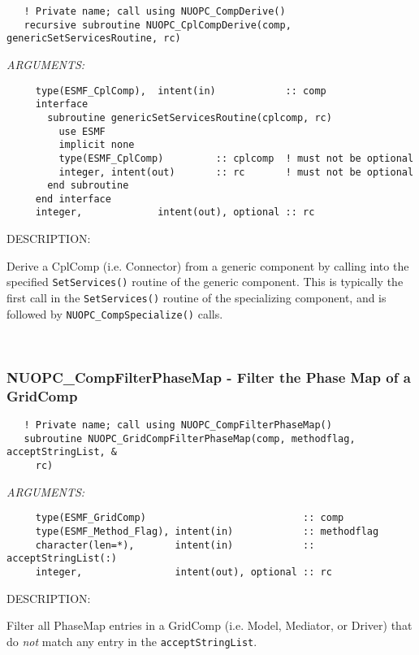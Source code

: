 \begin{verbatim}   ! Private name; call using NUOPC_CompDerive() 
   recursive subroutine NUOPC_CplCompDerive(comp, genericSetServicesRoutine, rc)\end{verbatim}{\em ARGUMENTS:}
\begin{verbatim}     type(ESMF_CplComp),  intent(in)            :: comp
     interface
       subroutine genericSetServicesRoutine(cplcomp, rc)
         use ESMF
         implicit none
         type(ESMF_CplComp)         :: cplcomp  ! must not be optional
         integer, intent(out)       :: rc       ! must not be optional
       end subroutine
     end interface
     integer,             intent(out), optional :: rc\end{verbatim}
{\sf DESCRIPTION:\\ }


     Derive a CplComp (i.e. Connector) from a generic
     component by calling into the specified {\tt SetServices()} routine of the
     generic component. This is typically the first call in the
     {\tt SetServices()} routine of the specializing component, and is followed
     by {\tt NUOPC\_CompSpecialize()} calls. 
 
\mbox{}\hrulefill\ 
 
\subsubsection [NUOPC\_CompFilterPhaseMap] {NUOPC\_CompFilterPhaseMap - Filter the Phase Map of a GridComp}


\begin{verbatim}   ! Private name; call using NUOPC_CompFilterPhaseMap()
   subroutine NUOPC_GridCompFilterPhaseMap(comp, methodflag, acceptStringList, &
     rc)\end{verbatim}{\em ARGUMENTS:}
\begin{verbatim}     type(ESMF_GridComp)                           :: comp
     type(ESMF_Method_Flag), intent(in)            :: methodflag
     character(len=*),       intent(in)            :: acceptStringList(:)
     integer,                intent(out), optional :: rc \end{verbatim}
{\sf DESCRIPTION:\\ }


   Filter all PhaseMap entries in a GridComp (i.e. Model, Mediator, or Driver)
   that do {\em not} match any entry in the {\tt acceptStringList}. 
 
